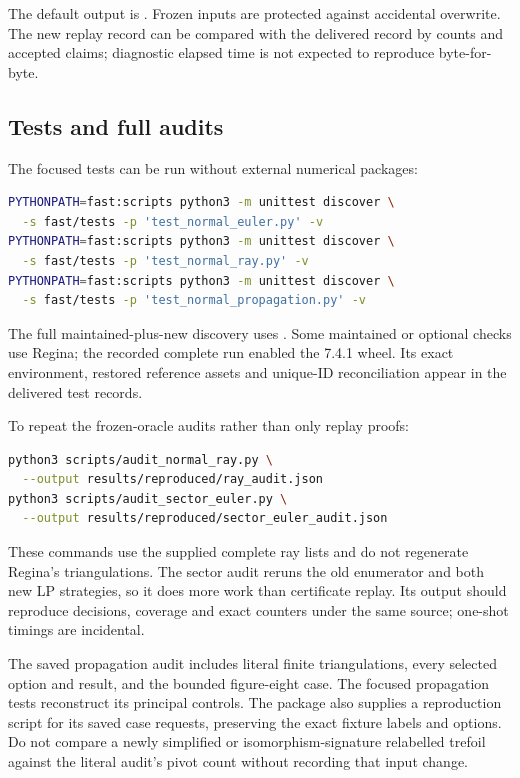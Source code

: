 The default output is . Frozen inputs are protected against accidental overwrite. The new replay record can be compared with the delivered record by counts and accepted claims; diagnostic elapsed time is not expected to reproduce byte-for-byte.

\subsection{Tests and full audits}

The focused tests can be run without external numerical packages:
\begin{lstlisting}[language=bash]
PYTHONPATH=fast:scripts python3 -m unittest discover \
  -s fast/tests -p 'test_normal_euler.py' -v
PYTHONPATH=fast:scripts python3 -m unittest discover \
  -s fast/tests -p 'test_normal_ray.py' -v
PYTHONPATH=fast:scripts python3 -m unittest discover \
  -s fast/tests -p 'test_normal_propagation.py' -v
\end{lstlisting}
The full maintained-plus-new discovery uses . Some maintained or optional checks use Regina; the recorded complete run enabled the 7.4.1 wheel. Its exact environment, restored reference assets and unique-ID reconciliation appear in the delivered test records.

To repeat the frozen-oracle audits rather than only replay proofs:
\begin{lstlisting}[language=bash]
python3 scripts/audit_normal_ray.py \
  --output results/reproduced/ray_audit.json
python3 scripts/audit_sector_euler.py \
  --output results/reproduced/sector_euler_audit.json
\end{lstlisting}
These commands use the supplied complete ray lists and do not regenerate Regina's triangulations. The sector audit reruns the old enumerator and both new LP strategies, so it does more work than certificate replay. Its output should reproduce decisions, coverage and exact counters under the same source; one-shot timings are incidental.

The saved propagation audit includes literal finite triangulations, every selected option and result, and the bounded figure-eight case. The focused propagation tests reconstruct its principal controls. The package also supplies a reproduction script for its saved case requests, preserving the exact fixture labels and options. Do not compare a newly simplified or isomorphism-signature relabelled trefoil against the literal audit's pivot count without recording that input change.

